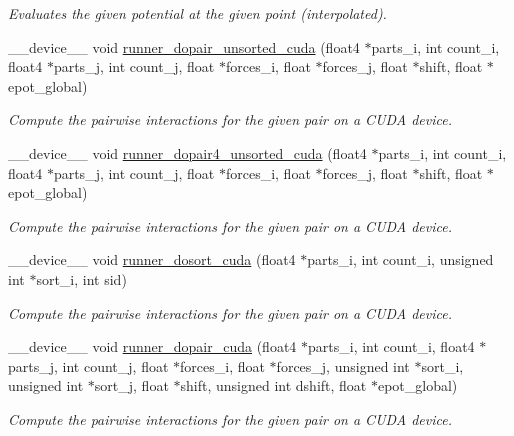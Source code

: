 \begin{DoxyCompactItemize}
\begin{DoxyCompactList}\small\item\em Evaluates the given potential at the given point (interpolated). \end{DoxyCompactList}\item 
\-\_\-\-\_\-device\-\_\-\-\_\- void \hyperlink{runner__cuda_8cu_a45e0ea4d8e8da106e1a963bc453ab8be}{runner\-\_\-dopair\-\_\-unsorted\-\_\-cuda} (float4 $\ast$parts\-\_\-i, int count\-\_\-i, float4 $\ast$parts\-\_\-j, int count\-\_\-j, float $\ast$forces\-\_\-i, float $\ast$forces\-\_\-j, float $\ast$shift, float $\ast$epot\-\_\-global)
\begin{DoxyCompactList}\small\item\em Compute the pairwise interactions for the given pair on a C\-U\-D\-A device. \end{DoxyCompactList}\item 
\-\_\-\-\_\-device\-\_\-\-\_\- void \hyperlink{runner__cuda_8cu_a441bf9c8f9589d0f3523dacbd52247ce}{runner\-\_\-dopair4\-\_\-unsorted\-\_\-cuda} (float4 $\ast$parts\-\_\-i, int count\-\_\-i, float4 $\ast$parts\-\_\-j, int count\-\_\-j, float $\ast$forces\-\_\-i, float $\ast$forces\-\_\-j, float $\ast$shift, float $\ast$epot\-\_\-global)
\begin{DoxyCompactList}\small\item\em Compute the pairwise interactions for the given pair on a C\-U\-D\-A device. \end{DoxyCompactList}\item 
\-\_\-\-\_\-device\-\_\-\-\_\- void \hyperlink{runner__cuda_8cu_a83c1d82042c124182356657ac4c47bea}{runner\-\_\-dosort\-\_\-cuda} (float4 $\ast$parts\-\_\-i, int count\-\_\-i, unsigned int $\ast$sort\-\_\-i, int sid)
\begin{DoxyCompactList}\small\item\em Compute the pairwise interactions for the given pair on a C\-U\-D\-A device. \end{DoxyCompactList}\item 
\-\_\-\-\_\-device\-\_\-\-\_\- void \hyperlink{runner__cuda_8cu_ac2dd3aec316aa072a957464a646b48d3}{runner\-\_\-dopair\-\_\-cuda} (float4 $\ast$parts\-\_\-i, int count\-\_\-i, float4 $\ast$parts\-\_\-j, int count\-\_\-j, float $\ast$forces\-\_\-i, float $\ast$forces\-\_\-j, unsigned int $\ast$sort\-\_\-i, unsigned int $\ast$sort\-\_\-j, float $\ast$shift, unsigned int dshift, float $\ast$epot\-\_\-global)
\begin{DoxyCompactList}\small\item\em Compute the pairwise interactions for the given pair on a C\-U\-D\-A device. \end{DoxyCompactList}\item 

\end{DoxyCompactItemize}
